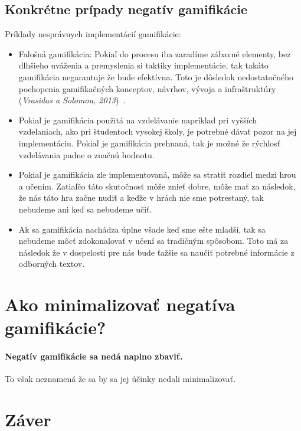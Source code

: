 \documentclass[10pt,oneside,slovak,a4paper]{article}
\begin{document}
\subsection{Konkrétne prípady negatív gamifikácie} \label{NegativnePriklady}

Príklady nesprávnych implementácií gamifikácie:
\begin{itemize}
\item Falošná gamifikácia: Pokiaľ do procesu iba zaradíme zábavné elementy, bez dlhšieho uváženia a premyslenia si taktiky implementácie, tak takáto gamifikácia negarantuje že bude efektívna. Toto je dôsledok nedostatočného pochopenia gamifikačných konceptov, návrhov, vývoja a infraštruktúry (\emph{Vrasidas a Solomou, 2013})~\cite{doi:10.1080/09523987.2013.839151}.
\item Pokiaľ je gamifikácia použitá na vzdelávanie napríklad pri vyšších vzdelaniach, ako pri študentoch vysokej školy, je potrebné dávať pozor na jej implementáciu. Pokiaľ je gamifikácia prehnaná, tak je možné že rýchlosť vzdelávania padne o značnú hodnotu.
\item Pokiaľ je gamifikácia zle implementovaná, môže sa stratiť rozdiel medzi hrou a učením. Zatiaľčo táto skutočnosť môže znieť dobre, môže mať za následok, že nás táto hra začne nudiť a keďže v hrách nie sme potrestaný, tak nebudeme ani keď sa nebudeme učiť.
\item Ak sa gamifikácia nachádza úplne všade keď sme ešte mladší, tak sa nebudeme môcť zdokonalovať v učení sa tradičným spôsobom. Toto má za následok že v dospelosti pre nás bude ťažšie sa naučiť potrebné informácie z odborných textov.
\end{itemize}




\section{Ako minimalizovať negatíva gamifikácie?} \label{MinimalizovanieNegatGamif}

\paragraph{Negatív gamifikácie sa nedá naplno zbaviť.}
To však neznamená že sa by sa jej účinky nedali minimalizovať.


\section{Záver} \label{Zaver} %






\end{document}
